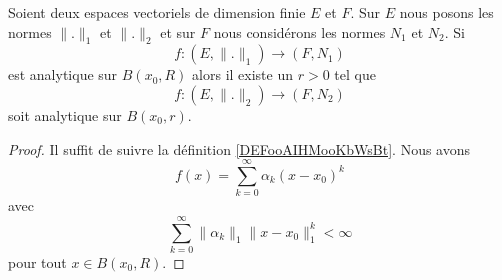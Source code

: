 \begin{proposition}	\label{PROPooKQXDooSGexpm}
	Soient deux espaces vectoriels de dimension finie \( E\) et \( F\). Sur \( E\) nous posons les normes \( \| . \|_1\) et \( \| . \|_2\) et sur \( F\) nous considérons les normes \( N_1\) et \( N_2\). Si
	\begin{equation}
		f \colon (E,\| . \|_1)\to (F,N_1)
	\end{equation}
	est analytique sur \( B(x_0,R)\) alors il existe un \( r>0\) tel que
	\begin{equation}
		f \colon (E,\| . \|_2)\to (F,N_2)
	\end{equation}
	soit analytique sur \( B(x_0,r)\).
\end{proposition}

\begin{proof}
	Il suffit de suivre la définition \ref{DEFooAIHMooKbWsBt}. Nous avons
	\begin{equation}
		f(x)=\sum_{k=0}^{\infty}\alpha_k(x-x_0)^k
	\end{equation}
	avec
	\begin{equation}
		\sum_{k=0}^{\infty}\| \alpha_k \|_1\| x-x_0 \|_1^k<\infty
	\end{equation}
	pour tout \( x\in B(x_0,R)\).


\end{proof}
